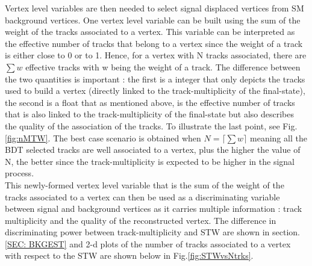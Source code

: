 \documentclass{cernatlasnote}
\begin{document}
\begin{appendices}
Vertex level variables are then needed to select signal displaced vertices from SM background vertices. One vertex level variable can be built using the sum of the weight of the tracks associated to a vertex. This variable can be interpreted as the effective number of tracks that belong to a vertex since the weight of a track is either close to 0 or to 1.
Hence, for a vertex with N tracks associated, there are $\sum w$ effective tracks with w being the weight of a track. The difference between the two quantities is important : the first is a integer that only depicts the tracks used to build a vertex (directly linked to the track-multiplicity of the final-state), the second is a float that as mentioned above, is the effective number of tracks  that is also linked to the track-multiplicity of the final-state but also describes the quality of the association of the tracks. To illustrate the last point, see Fig. \ref{fig:nMTW}. The best case scenario is obtained when $ N = \lceil \sum w \rceil$ meaning all the BDT selected tracks are well associated to a vertex, plus the higher the value of N, the better since the track-multiplicity is expected to be higher in the signal process.\\
This newly-formed vertex level variable that is the sum of the weight of the tracks associated to a vertex can then be used as a discriminating variable between signal and background vertices as it carries multiple information : track multiplicity and the quality of the reconstructed vertex. The difference in discriminating power between track-multiplicity and STW are shown in section.\ref{SEC: BKGEST} and 2-d plots of the number of tracks associated to a vertex with respect to the STW are shown below in Fig.\ref{fig:STWvsNtrks}. 


\end{appendices}
\end{document}
